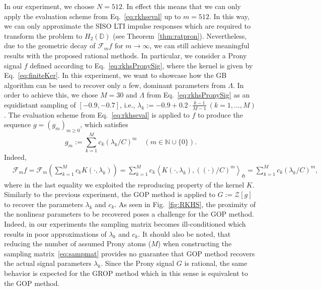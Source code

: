 \documentclass{arxiv}
\begin{document}
In our experiment, we choose $N=512$. In effect this means that we can only apply the evaluation scheme from Eq.~\eqref{eq:rkhseval} up to $m=512$. In this way, we can only approximate the SISO LTI impulse responses which are required to transform the problem to $H_2(\mathbb{D})$ (see Theorem~\ref{thm:ratpron}). Nevertheless, due to the geometric decay of $\mathcal{F}_m f$ for $m \to \infty$, we can still achieve meaningful results with the proposed rational methods. In particular, we consider a Prony signal $f$ defined according to Eq.~\eqref{eq:rkhsPronySig}, where the kernel is given by Eq.~\eqref{eq:finiteKer}. In this experiment, we want to showcase how the GB algorithm can be used to recover only a few, dominant parameters from $\Lambda$. In order to achieve this, we chose $M=30$ and $\Lambda$ from Eq.~\eqref{eq:rkhsPronySig} as an equidistant sampling of $[-0.9, -0.7]$, i.e., $\lambda_k := -0.9 + 0.2 \cdot \frac{k-1}{M-1} \ (k=1,\ldots,M)$. The evaluation scheme from Eq.~\eqref{eq:rkhseval} is applied to $f$ to produce the sequence $g={(g_m)}_{m \ge 0}$, which satisfies
\begin{equation*}
    g_m := \sum_{k=1}^{M}c_k (\lambda_k/C)^m \quad (m \in \mathbb{N} \cup \{0\}).
\end{equation*}
Indeed, 
\begin{equation*}
    \begin{split}
        & \mathcal{F}_m f = \mathcal{F}_m \left( \sum_{k=1}^M c_k K(\cdot, \lambda_k) \right) = \sum_{k=1}^M c_k \left\langle K(\cdot, \lambda_k), \left((\cdot)/C\right)^m \right\rangle_{\mathfrak{H}} = \sum_{k=1}^M c_k (\lambda_k/C)^m,
    \end{split}
\end{equation*}
where in the last equality we exploited the reproducing property of the kernel $K$. Similarly to the previous experiment, the GOP  method is applied to $G:= \mathcal{Z}[g]$ to recover the parameters $\lambda_k$ and $c_k$. As seen in  Fig.~\ref{fig:RKHS}, the proximity of the nonlinear parameters to be recovered poses a challenge for the  GOP method. Indeed, in our experiments the sampling matrix becomes ill-conditioned which results in poor approximations of $\lambda_k$ and $c_k$. It should also be noted, that reducing the number of assumed Prony atoms ($M$) when constructing the sampling matrix~\eqref{eq:sampmat} provides no guarantee that  GOP method recovers the actual signal parameters $\lambda_k$. Since the Prony signal $G$ is rational, the same behavior is expected for the GROP method which in this sense is equivalent to the GOP method.
\end{document}
